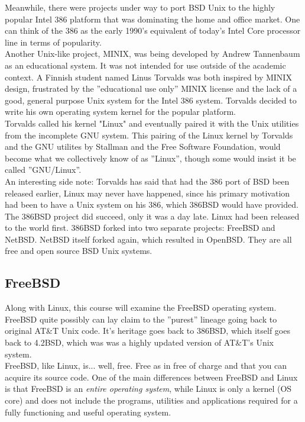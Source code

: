 Meanwhile, there were projects under way to port BSD Unix to the highly popular Intel 386 platform that was dominating the home and office market.  One can think of the 386 as the early 1990's equivalent of today's Intel Core processor line in terms of popularity.\\

Another Unix-like project, MINIX, was being developed by Andrew Tannenbaum as an educational system.  It was not intended for use outside of the academic context.  A Finnish student named Linus Torvalds was both inspired by MINIX design, frustrated by the ''educational use only'' MINIX license and the lack of a good, general purpose Unix system for the Intel 386 system.  Torvalds decided to write his own operating system kernel for the popular platform.\\

Torvalds called his kernel "Linux" and eventually paired it with the Unix utilities from the incomplete GNU system.  This pairing of the Linux kernel by Torvalds and the GNU utilites by Stallman and the Free Software Foundation, would become what we collectively know of as ''Linux'', though some would insist it be called ''GNU/Linux''.\\

An interesting side note: Torvalds has said that had the 386 port of BSD been released earlier, Linux may never have happened, since his primary motivation had been to have a Unix system on his 386, which 386BSD would have provided.\\

The 386BSD project did succeed, only it was a day late.  Linux had been released to the world first.  386BSD forked into two separate projects: FreeBSD and NetBSD.  NetBSD itself forked again, which resulted in OpenBSD.  They are all free and open source BSD Unix systems.\\

\subsection{FreeBSD}

Along with Linux, this course will examine the FreeBSD operating system.  FreeBSD quite possibly can lay claim to the ''purest'' lineage going back to original AT\&T Unix code.  It's heritage goes back to 386BSD, which itself goes back to 4.2BSD, which was was a highly updated version of AT\&T's Unix system.\\

FreeBSD, like Linux, is... well, free.  Free as in free of charge and that you can acquire its source code.  One of the main differences between FreeBSD and Linux is that FreeBSD is an \textit{entire operating system}, while Linux is only a kernel (OS core) and does not include the programs, utilities and applications required for a fully functioning and useful operating system.


